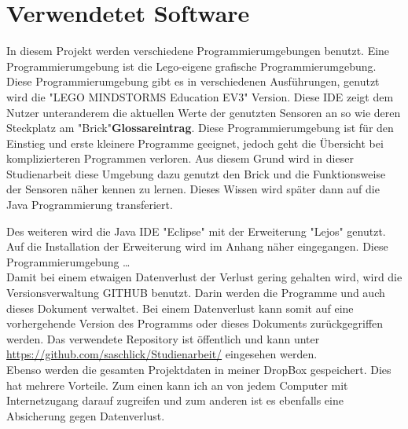 \section{Verwendetet Software}
In diesem Projekt werden verschiedene Programmierumgebungen benutzt. Eine Programmierumgebung ist die Lego-eigene grafische Programmierumgebung. Diese Programmierumgebung gibt es in verschiedenen Ausführungen, genutzt wird die "LEGO MINDSTORMS Education EV3" Version. Diese IDE zeigt dem Nutzer unteranderem die aktuellen Werte der genutzten Sensoren an so wie deren Steckplatz am "Brick"\textbf{Glossareintrag}. Diese Programmierumgebung ist für den Einstieg und erste kleinere Programme geeignet, jedoch geht die Übersicht bei komplizierteren Programmen verloren. Aus diesem Grund wird in dieser Studienarbeit diese Umgebung dazu genutzt den Brick und die Funktionsweise der Sensoren näher kennen zu lernen. Dieses Wissen wird später dann auf die Java Programmierung transferiert.

Des weiteren wird die Java  IDE "Eclipse" mit der Erweiterung "Lejos" genutzt. Auf die Installation der Erweiterung wird im Anhang näher eingegangen. Diese Programmierumgebung \dots \\

Damit bei einem etwaigen Datenverlust der Verlust gering gehalten wird, wird die Versionsverwaltung GITHUB benutzt. Darin werden die Programme und auch dieses Dokument verwaltet. Bei einem Datenverlust kann somit auf eine vorhergehende  Version des Programms oder dieses Dokuments zurückgegriffen werden. Das verwendete Repository ist öffentlich und kann unter \url{https://github.com/saschlick/Studienarbeit/} eingesehen werden.\\Ebenso werden die gesamten Projektdaten in meiner DropBox gespeichert. Dies hat mehrere Vorteile. Zum einen kann ich an von jedem Computer mit Internetzugang darauf zugreifen und zum anderen ist es ebenfalls eine Absicherung gegen Datenverlust.     








